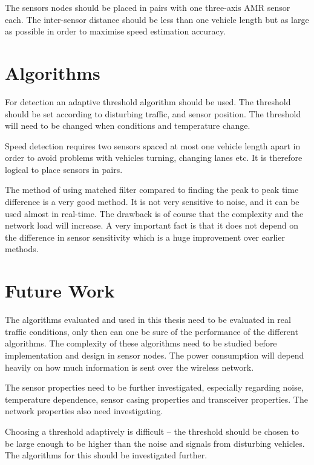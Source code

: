 The sensors nodes should be placed in pairs with one three-axis AMR sensor each. The inter-sensor distance should be less than one vehicle length but as large as possible in order to maximise speed estimation accuracy.

\section{Algorithms}

For detection an adaptive threshold algorithm should be used. The threshold should be set according to disturbing traffic, and sensor position. The threshold will need to be changed when conditions and temperature change. 

Speed detection requires two sensors spaced at most one vehicle length apart in order to avoid problems with vehicles turning, changing lanes etc. It is therefore logical to place sensors in pairs.

The method of using matched filter compared to finding the peak to peak time difference is a very good method. It is not very sensitive to noise, and it can be used almost in real-time. The drawback is of course that the complexity and the network load will increase. A very important fact is that it does not depend on the difference in sensor sensitivity which is a huge improvement over earlier methods.

\section{Future Work}

The algorithms evaluated and used in this thesis need to be evaluated in real traffic conditions, only then can one be sure of the performance of the different algorithms. The complexity of these algorithms need to be studied before implementation and design in sensor nodes. The power consumption will depend heavily on how much information is sent over the wireless network.

The sensor properties need to be further investigated, especially regarding noise, temperature dependence, sensor casing properties and transceiver properties. The network properties also need investigating.

Choosing a threshold adaptively is difficult -- the threshold should be chosen to be large  enough to be higher than the noise and signals from disturbing vehicles. The algorithms for this should be investigated further.